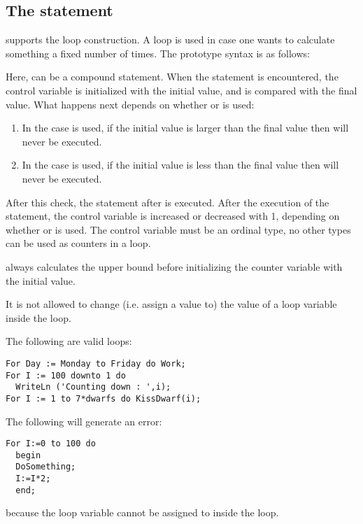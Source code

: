 \subsection{The  statement}
\fpc supports the  loop construction. A  loop is used in case
one wants to calculate something a fixed number of times.
The prototype syntax is as follows:

Here,  can be a compound statement.
When the  statement is encountered, the control variable is initialized with
the initial value, and is compared with the final value.
What happens next depends on whether  or  is used:
\begin{enumerate}
\item In the case  is used, if the initial value is larger than the final
value then  will never be executed.
\item In the case  is used, if the initial value is less than the final
value then  will never be executed.
\end{enumerate}
After this check, the statement after  is executed. After the
execution of the statement, the control variable is increased or decreased
with 1, depending on whether  or  is used.
The control variable must be an ordinal type, no other
types can be used as counters in a loop.

\begin{remark}
\fpc always calculates the upper bound before initializing
the counter variable with the initial value.
\end{remark}

\begin{remark}
It is not allowed to change (i.e. assign a value to) the value of a 
loop variable inside the loop.
\end{remark}

The following are valid loops:
\begin{verbatim}
For Day := Monday to Friday do Work;
For I := 100 downto 1 do
  WriteLn ('Counting down : ',i);
For I := 1 to 7*dwarfs do KissDwarf(i);
\end{verbatim}
The following will generate an error:
\begin{verbatim}
For I:=0 to 100 do
  begin
  DoSomething;
  I:=I*2;
  end;
\end{verbatim}
because the loop variable  cannot be assigned to inside the loop.

